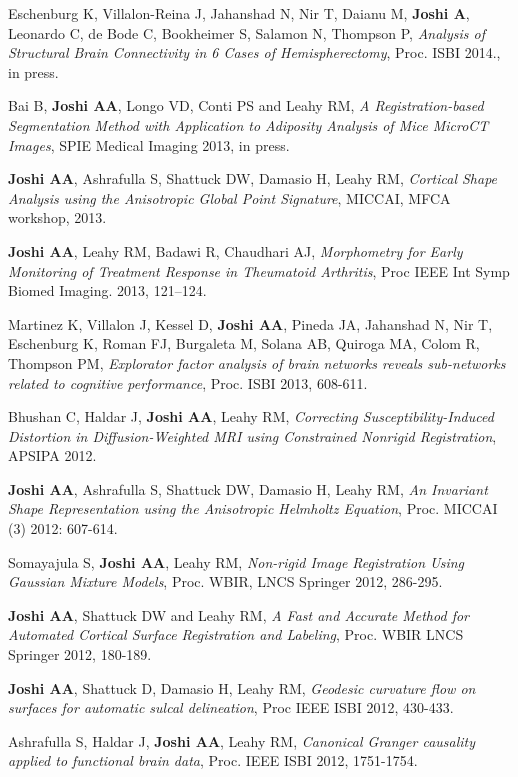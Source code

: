 \documentclass[overlapped,line,letterpaper]{res}
\begin{document}
\begin{resume}
Eschenburg K, Villalon-Reina J, Jahanshad N, Nir T, Daianu M, \textbf{Joshi A}, Leonardo C, de Bode C, Bookheimer S, Salamon N, Thompson P, \textit{Analysis of Structural Brain Connectivity in 6 Cases of Hemispherectomy},  Proc. ISBI 2014., in press.


Bai B, \textbf{Joshi AA}, Longo VD, Conti PS and Leahy RM, \textit{A Registration-based Segmentation Method with Application to Adiposity Analysis of Mice MicroCT Images}, SPIE Medical Imaging 2013, in press.

\textbf{Joshi AA}, Ashrafulla S, Shattuck DW, Damasio H, Leahy RM, \textit{Cortical Shape Analysis using the Anisotropic Global Point Signature}, MICCAI, MFCA workshop, 2013.
 
\textbf{Joshi AA}, Leahy RM, Badawi R, Chaudhari AJ, \textit{Morphometry for Early Monitoring of Treatment Response in Theumatoid Arthritis}, Proc IEEE Int Symp Biomed Imaging. 2013, 121–124. 

Martinez K, Villalon J, Kessel D, \textbf{Joshi AA}, Pineda JA, Jahanshad N, Nir T, Eschenburg K, Roman FJ, Burgaleta M, Solana AB, Quiroga MA, Colom R, Thompson PM, \textit{Explorator factor analysis of brain networks reveals sub-networks related to cognitive performance}, Proc. ISBI 2013, 608-611.

Bhushan C, Haldar J, \textbf{Joshi AA}, Leahy RM, \textit{Correcting Susceptibility-Induced Distortion in Diffusion-Weighted MRI using Constrained Nonrigid Registration}, APSIPA 2012. 

\textbf{Joshi AA}, Ashrafulla S, Shattuck DW, Damasio H, Leahy RM, \textit{An Invariant Shape Representation using the Anisotropic Helmholtz Equation}, Proc. MICCAI (3) 2012: 607-614.

Somayajula S, \textbf{Joshi AA}, Leahy RM, \textit{Non-rigid Image Registration Using Gaussian Mixture Models}, Proc. WBIR, LNCS Springer 2012, 286-295. 

\textbf{Joshi AA}, Shattuck DW and Leahy RM, \textit{A Fast and Accurate Method for Automated Cortical Surface Registration and Labeling}, Proc. WBIR LNCS Springer 2012, 180-189.

\textbf{Joshi AA}, Shattuck D, Damasio H, Leahy RM, \textit{Geodesic curvature flow on surfaces for automatic sulcal delineation}, Proc IEEE ISBI 2012, 430-433.

Ashrafulla S, Haldar J, \textbf{Joshi AA}, Leahy RM, \textit{Canonical Granger causality applied to functional brain data}, Proc. IEEE ISBI 2012, 1751-1754.


\end{resume}
\end{document}
